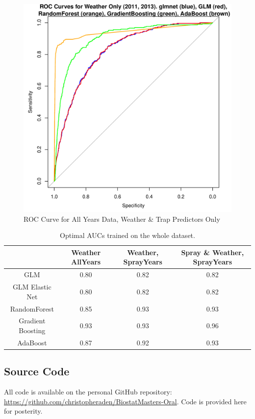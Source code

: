 \documentclass[12pt]{article}
\begin{document}
\begin{figure}[H] \center
\includegraphics[scale=.60]{ROC_SprayYears_WeatherOnly.pdf}
\caption*{ROC Curve for All Years Data, Weather \& Trap Predictors Only}
\end{figure}

\begin{table}[H] \center \footnotesize
\begin{tabular}{|c|ccc|} \hline
 & Weather AllYears & Weather, SprayYears & Spray \& Weather, SprayYears \\ \hline
GLM & 0.80 & 0.82 & 0.82 \\ 
  GLM Elastic Net & 0.80 & 0.82 & 0.82 \\ 
  RandomForest & 0.85 & 0.93 & 0.93 \\ 
  Gradient Boosting & 0.93 & 0.93 & 0.96 \\ 
  AdaBoost & 0.87 & 0.92 & 0.93 \\ \hline
\end{tabular}
\caption*{Optimal AUCs trained on the whole dataset.}
\end{table}

\newpage
\subsection{Source Code}
All code is available on the personal GitHub repository: \url{https://github.com/christopheraden/BiostatMasters-Oral}. Code is provided here for posterity.
\end{document}
